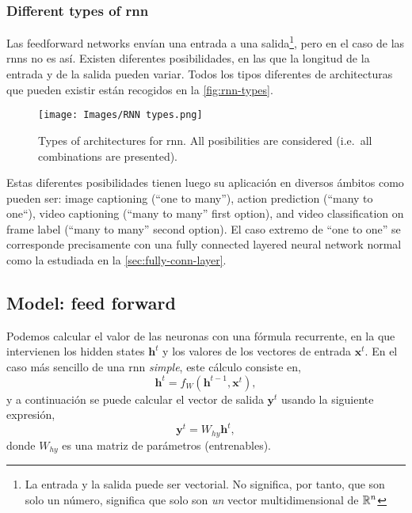 \subsubsection{Different types of \gls*{rnn}}
Las feedforward networks envían una entrada a una salida\footnote{La entrada y
  la salida puede ser vectorial. No significa, por tanto, que son solo un
  número, significa que solo son \emph{un} vector multidimensional de
  \(\mathbb{R}^n\)}, pero en el caso de las \glspl{rnn} no es así. Existen diferentes
posibilidades, en las que la longitud de la entrada y de la salida pueden
variar. Todos los tipos diferentes de architecturas que pueden existir están
recogidos en la \vref{fig:rnn-types}.

\begin{figure}[ht]
  \centering
  \texttt{[image: Images/RNN types.png]}
  \caption[Types of architectures for \acl*{rnn}]{Types of architectures
    for \gls{rnn}. All posibilities are considered (i.e.\ all combinations are
    presented).}
  \label{fig:rnn-types}
\end{figure}

Estas diferentes posibilidades tienen luego su aplicación en diversos ámbitos
como pueden ser: image captioning (``one to many''), action prediction (``many
to one``), video captioning (``many to many'' first option), and video
classification on frame label (``many to many'' second option). El caso extremo
de ``one to one'' se corresponde precisamente con una fully connected layered
neural network normal como la estudiada en la \vref{sec:fully-conn-layer}.

\subsection{Model: feed forward}

Podemos calcular el valor de las neuronas con una fórmula recurrente, en la que
intervienen los hidden states \(\mathbf{h}^t\) y los valores de los vectores de
entrada \(\mathbf{x}^t\). En el caso más sencillo de una \gls{rnn}
\emph{simple}, este cálculo consiste en,
\begin{equation} \label{eq:rnn-hidden}
  \mathbf{h}^t = f_{W} (\mathbf{h}^{t - 1}, \mathbf{x}^t),
\end{equation}
y a continuación se puede calcular el vector de salida \(\mathbf{y}^t\) usando
la siguiente expresión,
\begin{equation} \label{eq:rnn-out}
  \mathbf{y}^t = W_{hy}\mathbf{h}^t,
\end{equation}
donde \(W_{hy}\) es una matriz de parámetros (entrenables).

